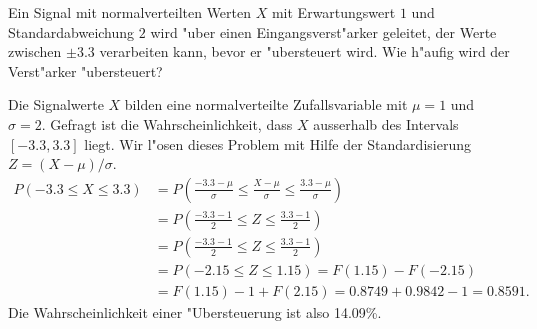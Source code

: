 Ein Signal mit normalverteilten Werten $X$ mit Erwartungswert
$1$ und Standardabweichung $2$ wird "uber einen Eingangsverst"arker
geleitet, der Werte zwischen $\pm3.3$ verarbeiten kann, bevor
er "ubersteuert wird. Wie h"aufig wird der Verst"arker "ubersteuert?

\begin{loesung}
Die Signalwerte $X$ bilden eine normalverteilte Zufallsvariable mit $\mu = 1$
und $\sigma=2$. Gefragt ist die Wahrscheinlichkeit, dass
$X$ ausserhalb des Intervals $[-3.3, 3.3]$ liegt. Wir l"osen dieses
Problem mit Hilfe der Standardisierung $Z=(X-\mu)/\sigma$.
\begin{align*}
P(-3.3\le X\le 3.3)
&=
P\left(
\frac{-3.3-\mu }{\sigma}
\le
\frac{X-\mu}{\sigma}
\le
\frac{3.3-\mu }{\sigma}
\right)
\\
&=
P\left(
\frac{-3.3-1}{2}
\le
Z
\le
\frac{3.3-1}{2}
\right)
\\
&=
P\left(
\frac{-3.3-1}{2}
\le
Z
\le
\frac{3.3-1}{2}
\right)
\\
&=P(-2.15 \le Z \le 1.15)
=F(1.15)-F(-2.15)\\
&=F(1.15)-1+F(2.15)
=0.8749+0.9842 - 1=0.8591.
\end{align*}
Die Wahrscheinlichkeit einer "Ubersteuerung ist also 14.09\%.
\end{loesung}

